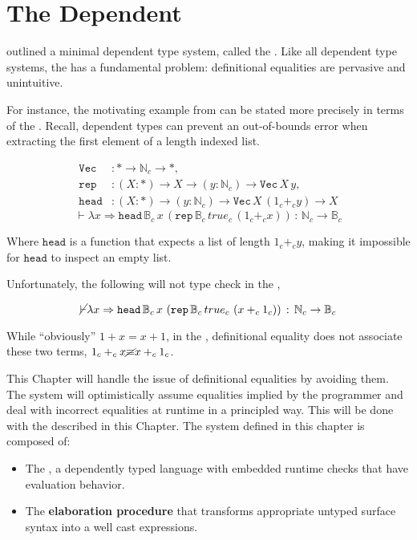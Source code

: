 \chapter{The Dependent \CSys{}}
\label{chapter:Cast}
\thispagestyle{myheadings}
 
 outlined a minimal dependent type system, called the \slang{}.
Like all dependent type systems, the \slang{} has a fundamental problem: definitional equalities are pervasive and unintuitive.
 
For instance, the motivating example from  can be stated more precisely in terms of the \slang{}.
Recall, dependent types can prevent an out-of-bounds error when extracting the first element of a length indexed list.

\begin{align*}
\mathtt{Vec} & :*\rightarrow\mathbb{N}_{c}\rightarrow*,\\
\mathtt{rep} & :\left(X:*\right)\rightarrow X\rightarrow\left(y:\mathbb{N}_{c}\right)\rightarrow\mathtt{Vec\,}X\,y,\\
\mathtt{head} & :\left(X:*\right)\rightarrow\left(y:\mathbb{N}_{c}\right)\rightarrow\mathtt{Vec}\,X\,\left(1_{c}+_{c}y\right)\rightarrow X
\end{align*}
\[
\vdash\lambda x\Rightarrow\mathtt{head}\,\mathbb{B}_{c}\,x\,\left(\mathtt{rep}\,\mathbb{B}_{c}\,true_{c}\,\left(1_{c}+_{c}x\right)\right)\,:\,\mathbb{N}_{c}\rightarrow\mathbb{B}_{c}
\]

Where $\mathtt{head}$ is a function that expects a list of length $1_{c}+_{c}y$, making it impossible for $\mathtt{head}$ to inspect an empty list.

Unfortunately, the following will not type check in the \slang{},

\[
\cancel{\vdash}\lambda x\Rightarrow\mathtt{head}\,\mathbb{B}_{c}\,x\,\left(\mathtt{rep}\,\mathbb{B}_{c}\,true_{c}\,\left(x+_{c}1_{c}\right)\right)\,:\,\mathbb{N}_{c}\rightarrow\mathbb{B}_{c}
\]

While ``obviously'' $1+x=x+1$, in the \slang{}, definitional equality does not associate these two terms, $1_{c}+_{c}x\cancel{\equiv}x+_{c}1_{c}$.
 
This Chapter will handle the issue of definitional equalities by avoiding them.
The system will optimistically assume equalities implied by the programmer and deal with incorrect equalities at runtime in a principled way.
This will be done with the \textbf{\csys{}} described in this Chapter.
The system defined in this chapter is composed of:
\begin{itemize}
\item The \textbf{\clang{}}, a dependently typed language with embedded runtime checks that have evaluation behavior.
\item The \textbf{elaboration procedure} that transforms appropriate untyped surface syntax into a well cast expressions.
\end{itemize}


